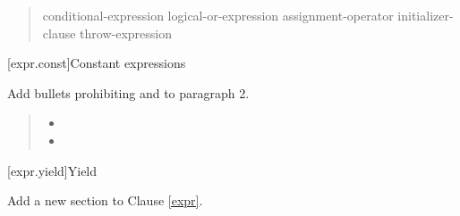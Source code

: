 \begin{quote}
\begin{bnf}
  \br
  conditional-expression\br
  logical-or-expression assignment-operator initializer-clause\br
  throw-expression \br
\end{bnf}
\end{quote}

\setcounter{section}{18}
[expr.const]{Constant expressions}%

Add bullets prohibiting  and  to paragraph 2.

\begin{quote}
\begin{itemize}
	\item 
	\item 
\end{itemize}
\end{quote}

\setcounter{section}{19}
[expr.yield]{Yield}%

Add a new section to Clause \ref{expr}.

